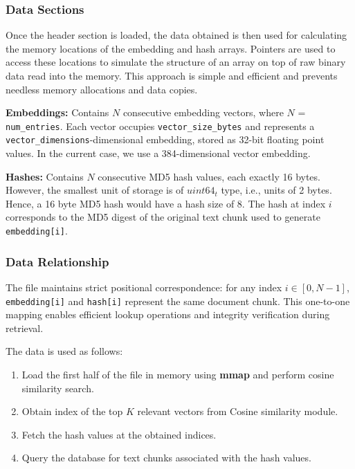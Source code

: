 \subsubsection{Data Sections}
\label{subsec:Vectordump_DataSections}
Once the header section is loaded, the data obtained is then used for calculating the memory locations of the embedding and hash arrays.
Pointers are used to access these locations to simulate the structure of an array on top of raw binary data read into the memory. This approach is simple and efficient and prevents needless memory allocations and data copies.

\textbf{Embeddings:} Contains $N$ consecutive embedding vectors, where $N$ = \texttt{num\_entries}. Each vector occupies \texttt{vector\_size\_bytes} and represents a \texttt{vector\_dimensions}-dimensional embedding, stored as 32-bit floating point values. In the current case, we use a 384-dimensional vector embedding.

\textbf{Hashes:} Contains $N$ consecutive MD5 hash values, each exactly 16 bytes. However, the smallest unit of storage is of $uint64_t$ type, i.e., units of 2 bytes. Hence, a 16 byte MD5 hash would have a hash size of 8. The hash at index $i$ corresponds to the MD5 digest of the original text chunk used to generate \texttt{embedding[i]}.


\subsubsection{Data Relationship}
\label{subsec:Vectordump_DataRelationship}

The file maintains strict positional correspondence: for any index $i \in [0, N-1]$, \texttt{embedding[i]} and \texttt{hash[i]} represent the same document chunk. This one-to-one mapping enables efficient lookup operations and integrity verification during retrieval.

The data is used as follows:
\begin{enumerate}[label=\arabic*.]
\item Load the first half of the file in memory using \textbf{mmap} and perform cosine similarity search.
    \item Obtain index of the top $K$ relevant vectors from Cosine similarity module.
    \item Fetch the hash values at the obtained indices.
    \item Query the database for text chunks associated with the hash values.
\end{enumerate}
    
